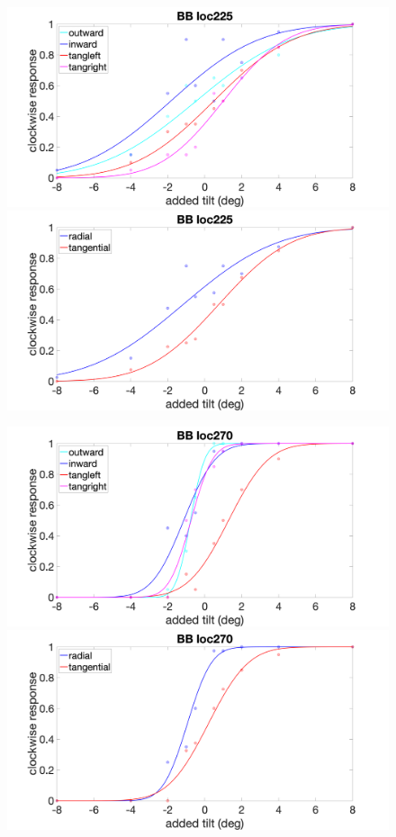\documentclass[11pt]{article} %
\begin{document}
\begin{figure}[H]
\centering %
\includegraphics[scale=.15]{Images/BB_PF_loc225_4conds.png}
\includegraphics[scale=.15]{Images/BB_PF_loc225_2conds.png}
\end{figure}
\begin{figure}[H]
\centering %
\includegraphics[scale=.15]{Images/BB_PF_loc270_4conds.png}
\includegraphics[scale=.15]{Images/BB_PF_loc270_2conds.png}
\end{figure}
\end{document}
